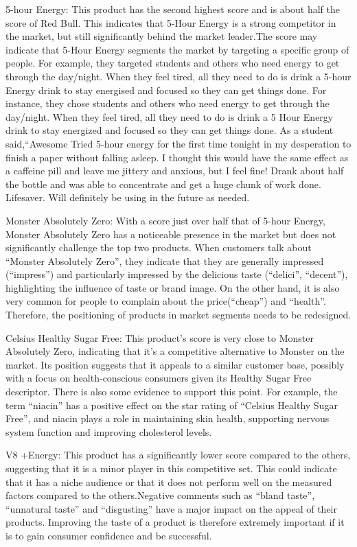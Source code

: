 \documentclass[
]{article}
\begin{document}
5-hour Energy: This product has the second highest score and is about
half the score of Red Bull. This indicates that 5-Hour Energy is a
strong competitor in the market, but still significantly behind the
market leader.The score may indicate that 5-Hour Energy segments the
market by targeting a specific group of people. For example, they
targeted students and others who need energy to get through the
day/night. When they feel tired, all they need to do is drink a 5-hour
Energy drink to stay energised and focused so they can get things done.
For instance, they chose students and others who need energy to get
through the day/night. When they feel tired, all they need to do is
drink a 5 Hour Energy drink to stay energized and focused so they can
get things done. As a student said,``Awesome Tried 5-hour energy for the
first time tonight in my desperation to finish a paper without falling
asleep. I thought this would have the same effect as a caffeine pill and
leave me jittery and anxious, but I feel fine! Drank about half the
bottle and was able to concentrate and get a huge chunk of work done.
Lifesaver. Will definitely be using in the future as needed.

Monster Absolutely Zero: With a score just over half that of 5-hour
Energy, Monster Absolutely Zero has a noticeable presence in the market
but does not significantly challenge the top two products. When
customers talk about ``Monster Absolutely Zero'', they indicate that
they are generally impressed (``impress'') and particularly impressed by
the delicious taste (``delici'', ``decent''), highlighting the influence
of taste or brand image. On the other hand, it is also very common for
people to complain about the price(``cheap'') and ``health''. Therefore,
the positioning of products in market segments needs to be redesigned.

Celsius Healthy Sugar Free: This product's score is very close to
Monster Absolutely Zero, indicating that it's a competitive alternative
to Monster on the market. Its position suggests that it appeals to a
similar customer base, possibly with a focus on health-conscious
consumers given its Healthy Sugar Free descriptor. There is also some
evidence to support this point. For example, the term ``niacin'' has a
positive effect on the star rating of ``Celsius Healthy Sugar Free'',
and niacin plays a role in maintaining skin health, supporting nervous
system function and improving cholesterol levels.

V8 +Energy: This product has a significantly lower score compared to the
others, suggesting that it is a minor player in this competitive set.
This could indicate that it has a niche audience or that it does not
perform well on the measured factors compared to the others.Negative
comments such as ``bland taste'', ``unnatural taste'' and ``disgusting''
have a major impact on the appeal of their products. Improving the taste
of a product is therefore extremely important if it is to gain consumer
confidence and be successful.
\end{document}
